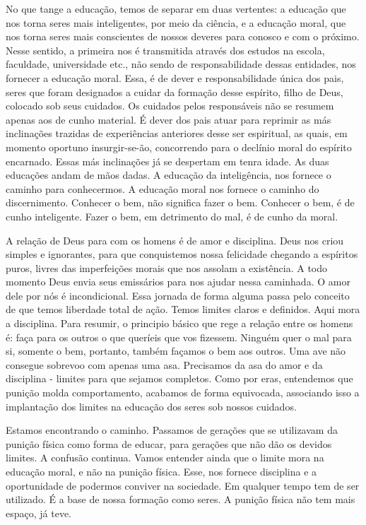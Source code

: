 \emdash{}No que tange a educação, temos de separar em duas vertentes: a educação que nos torna seres mais inteligentes, por meio da ciência, e a educação moral, que nos torna seres mais conscientes de nossos deveres para conosco e com o próximo. Nesse sentido, a primeira nos é transmitida através dos estudos na escola, faculdade, universidade etc., não sendo de responsabilidade dessas entidades, nos fornecer a educação moral. Essa, é de dever e responsabilidade única dos pais, seres que foram designados a cuidar da formação desse espírito, filho de Deus, colocado sob seus cuidados. Os cuidados pelos responsáveis não se resumem apenas aos de cunho material. É dever dos pais atuar para reprimir as más inclinações trazidas de experiências anteriores desse ser espiritual, as quais, em momento oportuno insurgir-se-ão, concorrendo para o declínio moral do espírito encarnado. Essas más inclinações já se despertam em tenra idade. As duas educações andam de mãos dadas. A educação da inteligência, nos fornece o caminho para conhecermos. A educação moral nos fornece o caminho do discernimento. Conhecer o bem, não significa fazer o bem. Conhecer o bem, é de cunho inteligente. Fazer o bem, em detrimento do mal, é de cunho da moral.

\emdash{}A relação de Deus para com os homens é de amor e disciplina. Deus nos criou simples e ignorantes, para que conquistemos nossa felicidade chegando a espíritos puros, livres das imperfeições morais que nos assolam a existência. A todo momento Deus envia seus emissários para nos ajudar nessa caminhada. O amor dele por nós é incondicional. Essa jornada de forma alguma passa pelo conceito de que temos liberdade total de ação. Temos limites claros e definidos. Aqui mora a disciplina. Para resumir, o principio básico que rege a relação entre os homens é: faça para os outros o que queríeis que vos fizessem. Ninguém quer o mal para si, somente o bem, portanto, também façamos o bem aos outros. Uma ave não consegue sobrevoo com apenas uma asa. Precisamos da asa do amor e da disciplina - limites para que sejamos completos. Como por eras, entendemos que punição molda comportamento, acabamos de forma equivocada, associando isso a implantação dos limites na educação dos seres sob nossos cuidados.

\emdash{}Estamos encontrando o caminho. Passamos de gerações que se utilizavam da punição física como forma de educar, para gerações que não dão os devidos limites. A confusão continua. Vamos entender ainda que o limite mora na educação moral, e não na punição física. Esse, nos fornece disciplina e a oportunidade de podermos conviver na sociedade. Em qualquer tempo tem de ser utilizado. É a base de nossa formação como seres. A punição física não tem mais espaço, já teve.

